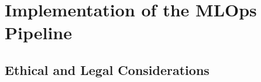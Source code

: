 \documentclass[12pt]{report}
\begin{document}





\chapter{Implementation of the MLOps Pipeline}

\section{Ethical and Legal Considerations}







%
%
\end{document}
